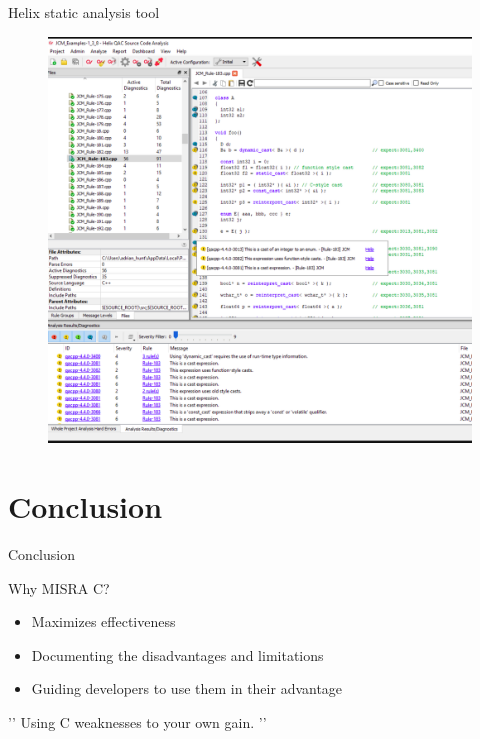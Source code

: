 \documentclass[t]{beamer} %
\begin{document}
\begin{frame}{Helix static analysis tool}
    \begin{figure}
        \centering
        \includegraphics[scale=0.22]{helix_IDE.png}
        \label{fig:my_label}
    \end{figure}
\end{frame}


\section{Conclusion}
\begin{frame}{Conclusion}

\begin{block}{Why MISRA C?}
\vspace{10pt}
\begin{itemize}
    \item Maximizes effectiveness
    \item Documenting the disadvantages and limitations
    \item Guiding developers to use them in their advantage
\end{itemize}
\vspace{12pt}
\begin{center}

’’ Using C weaknesses to your own gain. ’’

\end{center}

\end{block}{}

\end{frame}
\end{document}
